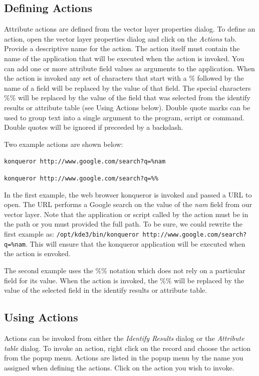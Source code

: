 \subsection{Defining Actions}
Attribute actions are defined from the vector layer properties dialog. To define
an action, open the vector layer properties dialog and click on the
\textit{Actions} tab. Provide a descriptive name for the action. The action
itself must contain the name of the application that will be executed when the
action is invoked. You can add one or more attribute field values as arguments
to the application. When the action is invoked any set of characters that start
with a \% followed by the name of a field will be replaced by the value of that
field.  The special characters \%\% \index{\%\%}will be replaced by the value of
the field that was selected from the identify results or attribute table (see
Using Actions below).  Double quote marks can be used to group text into a
single argument to the program, script or command. Double quotes will be ignored
if preceeded by a backslash.  

Two example actions are shown below:
\begin{compactenum}
  \item \texttt{konqueror http://www.google.com/search?q=\%nam}
  \item \texttt{konqueror http://www.google.com/search?q=\%\%}
\end{compactenum}
In the first example, the web browser konqueror is invoked and passed a URL to
open. The URL performs a Google search on the value of the \textit{nam} field
from our vector layer. Note that the application or script called by the action
must be in the path or you must provided the full path. To be sure, we could
rewrite the first example as: \texttt{/opt/kde3/bin/konqueror
http://www.google.com/search?q=\%nam}. This will ensure that the konqueror
application will be executed when the action is envoked.

The second example uses the \%\% notation which does not rely on a particular
field for its value. When the action is invoked, the \%\% will be replaced by
the value of the selected field in the identify results or attribute table.

\subsection{Using Actions}
Actions can be invoked from either the \textit{Identify Results} dialog or the
\textit{Attribute table} dialog. To invoke an action, right click on the record
and choose the action from the popup menu. Actions are listed in the popup menu
by the name you assigned when defining the actions. Click on the action you wish
to invoke.

